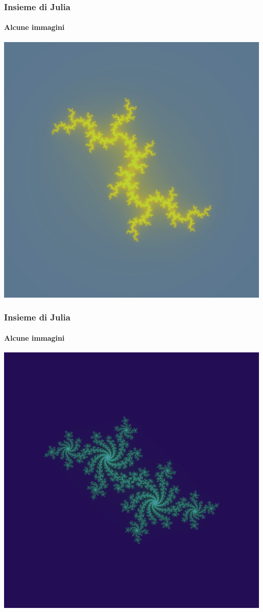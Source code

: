 \documentclass{beamer}
\begin{document}
			\begin{frame}
				\frametitle{Insieme di Julia}
				\framesubtitle{Alcune immagini}
				\begin{center}
					\includegraphics[width=0.7\linewidth]{"../Insieme di Julia/julia6"}
				\end{center}
			\end{frame}
			\begin{frame}
				\frametitle{Insieme di Julia}
				\framesubtitle{Alcune immagini}
				\begin{center}
					\includegraphics[width=0.7\linewidth]{"../Insieme di Julia/julia8"}
				\end{center}
			\end{frame}
\end{document}
